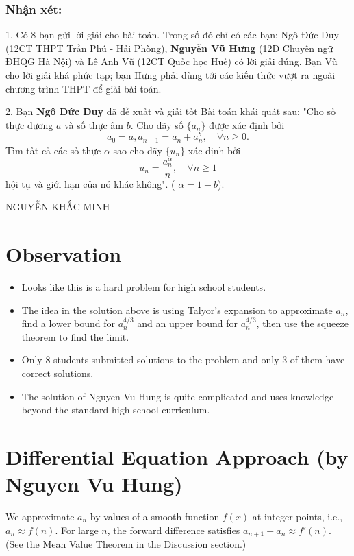 \documentclass{article}
\begin{document}
\subsubsection*{Nhận xét:}
1. Có 8 bạn gửi lời giải cho bài toán. 
Trong số đó chỉ có các bạn: Ngô Đức Duy (12CT THPT Trần Phú - Hải Phòng), 
\textbf{Nguyễn Vũ Hưng} (12D Chuyên ngữ ĐHQG Hà Nội) và 
Lê Anh Vũ (12CT Quốc học Huế) có lời giải đúng. 
Bạn Vũ cho lời giải khá phức tạp; 
bạn Hưng phải dùng tới các kiến thức vượt ra ngoài chương trình THPT để giải bài toán.

2. Bạn \textbf{Ngô Đức Duy} đã đề xuất và giải tốt Bài toán khái quát sau: 
"Cho số thực dương $a$ và số thực âm $b$. Cho dãy số $\{a_n\}$ được xác định bởi
$$ a_0 = a, a_{n+1} = a_n + a_n^b, \quad \forall n \ge 0. $$
Tìm tất cả các số thực $\alpha$ sao cho dãy $\{u_n\}$ xác định bởi
$$ u_n = \frac{a_n^\alpha}{n}, \quad \forall n \ge 1 $$
hội tụ và giới hạn của nó khác không". ( $\alpha = 1 - b$).

\hfill NGUYỄN KHẮC MINH

\section{Observation}

\begin{itemize}
    \item Looks like this is a hard problem for high school students.
    \item The idea in the solution above is using Talyor's expansion to approximate $a_n$, find a lower bound for $a_n^{4/3}$ and an upper bound for $a_n^{4/3}$, then use the squeeze theorem to find the limit.
    \item Only 8 students submitted solutions to the problem and only 3 of them have correct solutions.
    \item The solution of Nguyen Vu Hung is quite complicated and uses knowledge beyond the standard high school curriculum. 
\end{itemize}


\section{Differential Equation Approach (by Nguyen Vu Hung)}
We approximate $a_n$ by values of a smooth function $f(x)$ at 
integer points, i.e., $a_n \approx f(n)$. 
For large $n$, the forward difference satisfies $a_{n+1} - a_n \approx f'(n)$.
(See the Mean Value Theorem in the Discussion section.)
\end{document}
